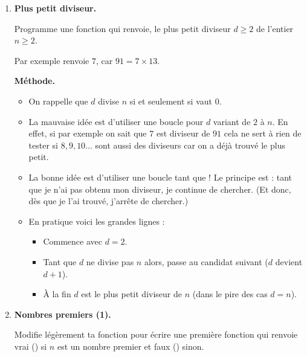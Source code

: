 \documentclass[11pt,class=report,crop=false]{standalone}
\begin{document}
\begin{activite}



\begin{enumerate}
  \item \textbf{Plus petit diviseur.}
  
  Programme une fonction  qui renvoie, le plus petit diviseur $d\ge2$ de l'entier $n\ge2$.
  
  Par exemple  renvoie $7$, car $91 = 7 \times 13$.
  
  \textbf{Méthode.}
  \begin{itemize}
    \item On rappelle que $d$ divise $n$ si et seulement si  vaut $0$.
    \item La mauvaise idée est d'utiliser une boucle \og{}pour $d$ variant de $2$ à $n$\fg{}. En effet, si par exemple on sait que $7$ est diviseur de $91$ cela ne sert à rien de tester si $8,9,10\ldots$ sont aussi des diviseurs car on a déjà trouvé le plus petit.
    
    \item La bonne idée est d'utiliser une boucle \og{}tant que\fg{} !
    Le principe est : \og{}tant que je n'ai pas obtenu mon diviseur, je continue de chercher\fg{}. (Et donc, dès que je l'ai trouvé, j'arrête de chercher.)
    
    \item En pratique voici les grandes lignes :
    \begin{itemize}
      \item Commence avec $d=2$.
      \item Tant que $d$ ne divise pas $n$ alors, passe au candidat suivant ($d$ devient $d+1$).
      \item À la fin $d$ est le plus petit diviseur de $n$ (dans le pire des cas $d=n$).
     \end{itemize} 
  \end{itemize}
  
  
  \item \textbf{Nombres premiers (1).}
  
  Modifie légèrement ta fonction  pour écrire une première fonction  qui renvoie \og{}vrai\fg{} () si $n$ est un nombre premier et \og{}faux\fg{} () sinon.
  

\end{enumerate}
\end{activite}
\end{document}
